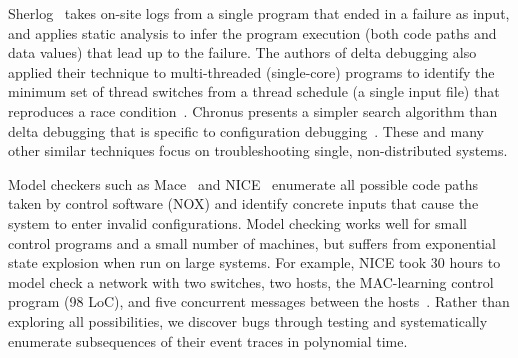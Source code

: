 Sherlog~\cite{Yuan:2010:SED:1736020.1736038} takes on-site logs from a
single program that ended in a failure as input, and applies static analysis to infer the
program execution (both code paths and data values) that lead up to the failure.
The authors of delta debugging
also applied their technique to multi-threaded (single-core) programs
to identify the minimum set of thread
switches from a thread schedule (a single input file) that reproduces
a race condition~\cite{choi2002isolating}.
Chronus presents a simpler search
algorithm than delta debugging that is specific to configuration
debugging~\cite{whitaker2004configuration}.
These and many other similar techniques focus on troubleshooting single, non-distributed
systems.


Model checkers such as Mace~\cite{Killian:2007:MLS:1250734.1250755} and
NICE~\cite{nice} enumerate all possible code paths taken by control software (NOX)
and identify concrete inputs that cause
the system to enter invalid configurations. Model checking works well for small
control programs and a small number of machines, but suffers from exponential
state explosion when run on large systems. For example, NICE took 30 hours to
model check a network with two switches, two hosts, the MAC-learning
control program (98 LoC), and five concurrent
messages between the hosts~\cite{nice}. Rather than exploring all
possibilities, we discover bugs through testing and systematically
enumerate subsequences of their event traces
in polynomial time.

